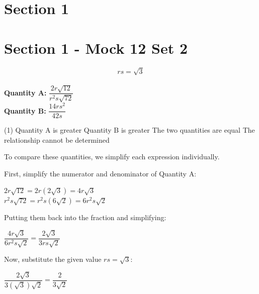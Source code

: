 \documentclass[11pt,paper=a4,answers]{exam}
\begin{document}
\begin{questions}
\pointsinrightmargin
\pointsdroppedatright
\marksnotpoints
{}
\pointformat{\boldmath\themarginpoints}
\bracketedpoints
\section*{Section 1}

\section*{Section 1 - Mock 12 Set 2}


\question
\[ rs = \sqrt{3} \]
\\[0.3cm]
\textbf{Quantity A: } $\dfrac{2r\sqrt{12}}{r^2 s \sqrt{72}}$ \\
\textbf{Quantity B: } $\dfrac{14rs^2}{42s}$

\begin{tasks}(1)
\task[A)] Quantity A is greater
\task[B)] Quantity B is greater
\task[C)] The two quantities are equal
\task[D)] The relationship cannot be determined
\end{tasks}

\begin{solution}
To compare these quantities, we simplify each expression individually.
\vspace{5pt}

First, simplify the numerator and denominator of Quantity A:
\begin{center}
$2r\sqrt{12} = 2r(2\sqrt{3}) = 4r\sqrt{3}$ \\
\vspace{5pt}
$r^2s\sqrt{72} = r^2s(6\sqrt{2}) = 6r^2s\sqrt{2}$
\end{center}
\vspace{5pt}

Putting them back into the fraction and simplifying:
\begin{center}
$\dfrac{4r\sqrt{3}}{6r^2s\sqrt{2}} = \dfrac{2\sqrt{3}}{3rs\sqrt{2}}$
\end{center}
\vspace{5pt}

Now, substitute the given value $rs = \sqrt{3}$:
\begin{center}
$\dfrac{2\sqrt{3}}{3(\sqrt{3})\sqrt{2}} = \dfrac{2}{3\sqrt{2}}$
\end{center}
\vspace{5pt}


\end{solution}
\end{questions}
\end{document}

